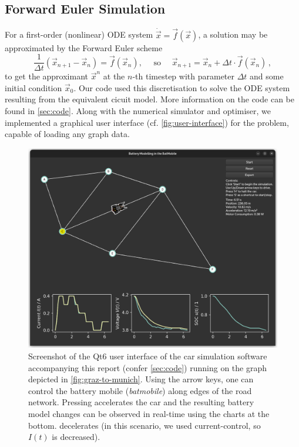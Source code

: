 \documentclass{prettytex/ox/mmsc-special-topic}
\begin{document}
  \subsection{Forward Euler Simulation}
  For a first-order (nonlinear) ODE system $\dot{\vec{x}} = \vec{f}(\vec{x})$, a solution may be approximated by the Forward Euler scheme
  $$\frac{1}{\Delta t} \left(\vec{x}_{n+1} - \vec{x}_{n}\right) = \vec{f}(\vec{x}_n), \quad \text{ so } \quad \vec{x}_{n+1} = \vec{x}_{n} + \Delta t \cdot \vec{f}(\vec{x}_n)\,,$$
  to get the approximant $\vec{x}^n$ at the $n$-th timestep with parameter $\Delta t$ and some initial condition $\vec{x}_{0}$.
  Our code used this discretisation to solve the ODE system resulting from the equivalent cicuit model. More information on the code can be found in \autoref{sec:code}.
  Along with the numerical simulator and optimiser, we implemented a graphical user interface (cf. \autoref{fig:user-interface}) for the problem, capable of loading any graph data.

  \begin{figure}[H]
    \centering
    \includegraphics[width=0.8\linewidth]{figures/screenshot.png}
    \caption{Screenshot of the Qt6 user interface of the car simulation software accompanying this report (confer \autoref{sec:code}) running on the graph depicted in \autoref{fig:graz-to-munich}. Using the arrow keys, one can control the battery mobile (\textit{batmobile}) along edges of the road network. Pressing \keys{$\uparrow$} accelerates the car and the resulting battery model changes can be observed in real-time using the charts at the bottom. \keys{$\downarrow$} decelerates (in this scenario, we used current-control, so $I(t)$ is decreased).}
    \label{fig:user-interface}
  \end{figure}
\end{document}
